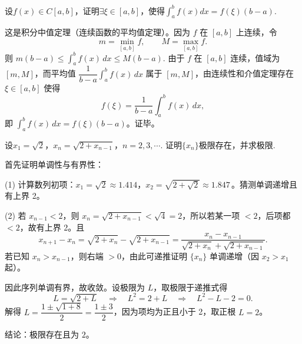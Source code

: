 \begin{question}{}{}

    设$f(x)\in C[a,b]$，证明$\exists\xi\in[a,b]$，使得$\int_{a}^{b}f(x)dx=f(\xi)(b-a)$.
\end{question}
\begin{solution}
    这是积分中值定理（连续函数的平均值定理）。因为 $f$ 在 $[a,b]$ 上连续，令
    \[
        m=\min_{[a,b]} f,\qquad M=\max_{[a,b]} f.
    \]
    则 $m(b-a)\le\int_a^b f(x)\,dx\le M(b-a)$. 由于 $f$ 在 $[a,b]$ 连续，值域为 $[m,M]$，而平均值 $\dfrac{1}{b-a}\int_a^b f(x)\,dx$ 属于 $[m,M]$，由连续性和介值定理存在 $\xi\in[a,b]$ 使得
    \[
        f(\xi)=\frac{1}{b-a}\int_a^b f(x)\,dx,
    \]
    即 $\int_a^b f(x)\,dx=f(\xi)(b-a)$。证毕。
\end{solution}

\begin{question}{}{}

    设$x_{1}=\sqrt{2}$，$x_{n}=\sqrt{2+x_{n-1}}$，$n=2,3,\cdots$. 证明$\{x_{n}\}$极限存在，并求极限.
\end{question}
\begin{solution}
    首先证明单调性与有界性：

    (1) 计算数列初项：$x_1=\sqrt2\approx1.414$，$x_2=\sqrt{2+\sqrt2}\approx1.847\,$。猜测单调递增且有上界 2。

    (2) 若 $x_{n-1}<2$，则 $x_n=\sqrt{2+x_{n-1}}<\sqrt{4}=2$，所以若某一项 $<2$，后项都 $<2$，故有上界 2。且
    \[
        x_{n+1}-x_n=\sqrt{2+x_n}-\sqrt{2+x_{n-1}}=\frac{x_n-x_{n-1}}{\sqrt{2+x_n}+\sqrt{2+x_{n-1}}}.
    \]
    若已知 $x_n>x_{n-1}$，则右端 $>0$，由此可递推证明 $\{x_n\}$ 单调递增（因 $x_2>x_1$ 起）。

    因此序列单调有界，故收敛。设极限为 $L$，取极限于递推式得
    \[
        L=\sqrt{2+L}\quad\Rightarrow\quad L^2=2+L\quad\Rightarrow\quad L^2-L-2=0.
    \]
    解得 $L=\dfrac{1\pm\sqrt{1+8}}{2}=\dfrac{1\pm3}{2}$，因为项均为正且小于 2，取正根 $L=2$。

    结论：极限存在且为 $2$。
\end{solution}